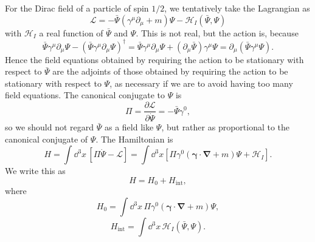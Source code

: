 For the Dirac field of a particle of spin $1/2$, we tentatively take the
Lagrangian as
\begin{equation}
\mathcal L=-\bar\Psi(\gamma^\mu\partial_\mu+m)\Psi
-\mathcal H_I(\bar\Psi,\Psi)
\tag{7.5.34}\label{eq:7.5.34}
\end{equation}
with $\mathcal H_I$ a real function of $\bar\Psi$ and $\Psi$. This is not real,
but the action is, because
\[
\bar\Psi\gamma^\mu\partial_\mu\Psi
-(\bar\Psi\gamma^\mu\partial_\mu\Psi)^\dagger
=\bar\Psi\gamma^\mu\partial_\mu\Psi
+(\partial_\mu\bar\Psi)\gamma^\mu\Psi
=\partial_\mu(\bar\Psi\gamma^\mu\Psi).
\]
Hence the field equations obtained by requiring the action to be stationary
with respect to $\bar\Psi$ are the adjoints of those obtained by requiring the
action to be stationary with respect to $\Psi$, as necessary if we are to
avoid having too many field equations. The canonical conjugate to $\Psi$ is
\begin{equation}
\Pi=\frac{\partial\mathcal L}{\partial\dot\Psi}=-\bar\Psi\gamma^0,
\tag{7.5.35}\label{eq:7.5.35}
\end{equation}
so we should not regard $\bar\Psi$ as a field like $\Psi$, but rather as
proportional to the canonical conjugate of $\Psi$. The Hamiltonian is
\[
H=\int \dd^3x\,[\Pi\dot\Psi-\mathcal L]
=\int \dd^3x\left[\Pi\gamma^0(\boldsymbol\gamma\cdot\boldsymbol\nabla+m)\Psi
+\mathcal H_I\right].
\]
We write this as
\begin{equation}
H=H_0+H_{\mathrm{int}},
\tag{7.5.36}\label{eq:7.5.36}
\end{equation}
where
\begin{equation}
H_0=\int \dd^3x\,\Pi\gamma^0(\boldsymbol\gamma\cdot\boldsymbol\nabla+m)\Psi,
\tag{7.5.37}\label{eq:7.5.37}
\end{equation}
\begin{equation}
H_{\mathrm{int}}=\int \dd^3x\,\mathcal H_I(\bar\Psi,\Psi).
\tag{7.5.38}\label{eq:7.5.38}
\end{equation}

